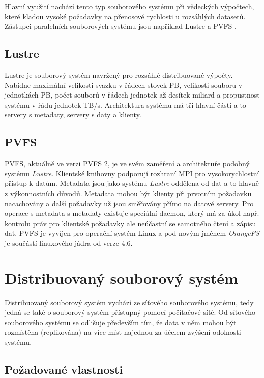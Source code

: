 \documentclass[czech,DP]{thesiskiv}
\begin{document}
Hlavní využití nachází tento typ souborového systému při vědeckých výpočtech, které kladou vysoké požadavky na přenosové rychlosti u rozsáhlých datasetů. Zástupci paralelních souborových systému jsou například Lustre \cite{lustredoc} a PVFS \cite{pvfspaper}.

\subsection{Lustre}

Lustre je souborový systém navržený pro rozsáhlé distribuované výpočty. Nabídne maximální velikosti svazku v řádech stovek PB, velikosti souboru v jednotkách PB, počet souborů v řádech jednotek až desítek miliard a propustnost systému v řádu jednotek TB/s. Architektura systému má tři hlavní části a to servery s metadaty, servery s daty a klienty. 

\subsection{PVFS}

PVFS, aktuálně ve verzi PVFS 2, je ve svém zaměření a architektuře podobný systému \textit{Lustre}. Klientské knihovny podporují rozhraní MPI pro vysokorychlostní přístup k datům. Metadata jsou jako systému \textit{Lustre} oddělena od dat a to hlavně z výkonnostních důvodů. Metadata mohou být klienty při prvotním požadavku nacachovány a další požadavky už jsou směřovány přímo na datové servery. Pro operace s metadata s metadaty existuje speciální daemon, který má za úkol např. kontrolu práv pro klientské požadavky ale neúčastní se samotného čtení a zápisu dat. PVFS je vyvíjen pro operační systém Linux a pod novým jménem \textit{OrangeFS} je součástí linuxového jádra od verze 4.6.

\section{Distribuovaný souborový systém} \label{dfs}

Distribuovaný souborový systém vychází ze síťového souborového systému, tedy jedná se také o souborový systém přístupný pomocí počítačové sítě. Od síťového souborového systému se odlišuje především tím, že data v něm mohou být rozmístěna (replikována) na více míst najednou za účelem zvýšení odolnosti systému.

\subsection{Požadované vlastnosti}
\end{document}
